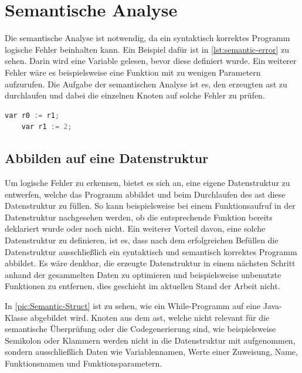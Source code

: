 \chapter{Semantische Analyse} \label{chap:semantic}

Die semantische Analyse ist notwendig, da ein syntaktisch korrektes Programm logische Fehler beinhalten kann. Ein Beispiel dafür ist in \cref{lst:semantic-error} zu sehen. Darin wird eine Variable gelesen, bevor diese definiert wurde. Ein weiterer Fehler wäre es beispielsweise eine Funktion mit zu wenigen Parametern aufzurufen. Die Aufgabe der semantischen Analyse ist es, den erzeugten \ac{ast} zu durchlaufen und dabei die einzelnen Knoten auf solche Fehler zu prüfen.

\begin{lstlisting}[language=c, caption=Beispiel für einen semantischen Fehler, label={lst:semantic-error}]
	var r0 := r1;
	var r1 := 2;
\end{lstlisting}

\section{Abbilden auf eine Datenstruktur} \label{sec:semantic-datenstruktur}
Um logische Fehler zu erkennen, bietet es sich an, eine eigene Datenstruktur zu entwerfen, welche das Programm abbildet und beim Durchlaufen des \ac{ast} diese Datenstruktur zu füllen. So kann beispielsweise bei einem Funktionsaufruf in der Datenstruktur nachgesehen werden, ob die entsprechende Funktion bereits deklariert wurde oder noch nicht. Ein weiterer Vorteil davon, eine solche Datenstruktur zu definieren, ist es, dass nach dem erfolgreichen Befüllen die Datenstruktur ausschließlich ein syntaktisch und semantisch korrektes Programm abbildet. Es wäre denkbar, die erzeugte Datenstruktur in einem nächsten Schritt anhand der gesammelten Daten zu optimieren und beispielsweise unbenutzte Funktionen zu entfernen, dies geschieht im aktuellen Stand der Arbeit nicht.

In \cref{pic:Semantic-Struct} ist zu sehen, wie ein While-Programm auf eine Java-Klasse abgebildet wird. Knoten aus dem \ac{ast}, welche nicht relevant für die semantische Überprüfung oder die Codegenerierung sind, wie beispielsweise Semikolon oder Klammern werden nicht in die Datenstruktur mit aufgenommen, sondern ausschließlich Daten wie Variablennamen, Werte einer Zuweisung, Name, Funktionsnamen und Funktionsparametern.


